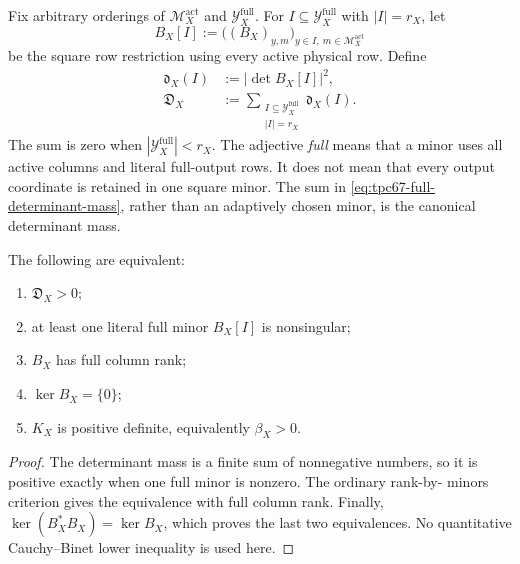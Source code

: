 Fix arbitrary orderings of
\(\mathcal M_X^{\mathrm{act}}\) and
\(\mathcal Y_X^{\mathrm{full}}\).  For
\(I\subseteq\mathcal Y_X^{\mathrm{full}}\) with \(|I|=r_X\), let
\begin{equation}
 B_X[I]
 :=
 \bigl((B_X)_{y,m}\bigr)_{
       y\in I,\ m\in\mathcal M_X^{\mathrm{act}}}
 \label{eq:tpc67-full-square-minor}
\end{equation}
be the square row restriction using every active physical row.  Define
\begin{align}
 \mathfrak d_X(I)
 &:=|\det B_X[I]|^2,
 \label{eq:tpc67-one-minor-mass}\\
 \mathfrak D_X
 &:=
 \sum_{\substack{I\subseteq\mathcal Y_X^{\mathrm{full}}\\|I|=r_X}}
 \mathfrak d_X(I).
 \label{eq:tpc67-full-determinant-mass}
\end{align}
The sum is zero when
\(|\mathcal Y_X^{\mathrm{full}}|<r_X\).  The adjective \emph{full}
means that a minor uses all active columns and literal full-output rows.
It does not mean that every output coordinate is retained in one square
minor.  The sum in \eqref{eq:tpc67-full-determinant-mass}, rather than an
adaptively chosen minor, is the canonical determinant mass.

\begin{proposition}
\label{prop:tpc67-actual-rank-criterion}
The following are equivalent:
\begin{enumerate}[label=\textup{(\roman*)},leftmargin=3em]
 \item \(\mathfrak D_X>0\);
 \item at least one literal full minor \(B_X[I]\) is nonsingular;
 \item \(B_X\) has full column rank;
 \item \(\ker B_X=\{0\}\);
 \item \(K_X\) is positive definite, equivalently \(\beta_X>0\).
\end{enumerate}
\end{proposition}

\begin{proof}
The determinant mass is a finite sum of nonnegative numbers, so it is
positive exactly when one full minor is nonzero.  The ordinary rank-by-
minors criterion gives the equivalence with full column rank.  Finally,
\(\ker(B_X^*B_X)=\ker B_X\), which proves the last two equivalences.
No quantitative Cauchy--Binet lower inequality is used here.
\end{proof}

